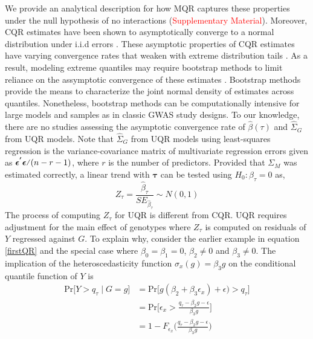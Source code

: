 \documentclass[12pt]{article}
\newcommand\vfrac[2]{\ThisStyle{%
  \setbox0=\hbox{$\SavedStyle#1#2$}%
  \setbox2=\hbox{$\SavedStyle X$}%
  \ifdim\ht0>\ht2\setlength{\ht0}{\ht2}\fi%
  #1\mathord{\stretchto{\raisebox{2.3\LMpt}{$\SavedStyle/$}}{\ht0}}#2}}
\begin{document}
\begin{appendices}
We provide an analytical description for how MQR captures these properties under the null hypothesis of no interactions (\textcolor{red}{Supplementary Material}). Moreover, CQR estimates have been shown to asymptotically converge to a normal distribution under i.i.d errors \cite{koenker1982robust, powell1984least, kim2003estimation}. These asymptotic properties of CQR estimates have varying convergence rates that weaken with extreme distribution tails \cite{chernozhukov2005extremal}. As a result, modeling extreme quantiles may require bootstrap methods to limit reliance on the assymptotic convergence of these estimates \cite{chernozhukov2016extremal}. Bootstrap methods provide the means to characterize the joint normal density of estimates across quantiles. Nonetheless, bootstrap methods can be computationally intensive for large models and samples as in classic GWAS study designs. To our knowledge, there are no studies assessing the asymptotic convergence rate of $\widehat{\beta} (\tau)$ and $\widehat{\Sigma}_G$ from UQR models. Note that $\widehat{\Sigma}_G$ from UQR models using least-squares regression is the variance-covariance matrix of multivariate regression errors given as $\vfrac{\bm{\epsilon^{'}} \bm{\epsilon}}{(n-r-1)}$, where $r$ is the number of predictors. Provided that $\Sigma_M$ was estimated correctly, a linear trend with $\bm{\tau}$ can be tested using $H_0: \beta_{\tau}=0$ as,
\begin{equation}
Z_{\tau}=\frac{\widehat{\beta}_{\tau}}{SE_{\widehat{\beta}_{\tau}}} \sim N(0,1)
\end{equation}
The process of computing $Z_\tau$ for UQR is different from CQR. UQR requires adjustment for the main effect of genotypes where $Z_\tau$ is computed on residuals of $Y$ regressed against $G$. To explain why, consider the earlier example in equation \ref{firstQR} and the special case where $\beta_0=\beta_1=0$, $\beta_2\neq 0$ and $\beta_3\neq 0$. The implication of the heteroscedasticity function $\sigma_x (g) = \beta_3 g$ on the conditional quantile function of $Y$ is
\begin{equation}
\begin{split}
\textrm{Pr}\big[Y>q_\tau\mid G=g\big] &= \textrm{Pr}\big[g(\beta_2+\beta_3 \epsilon_x)+ \epsilon) > q_\tau\big] \\
&=\textrm{Pr}\big[\epsilon_x > \frac{q_\tau - \beta_2 g - \epsilon}{\beta_3 g}\big] \\
&= 1-F_{\epsilon_x} \big(\frac{q_\tau - \beta_2 g - \epsilon}{\beta_3 g}\big) 
\end{split}

\end{equation}
\end{appendices}
\end{document}
